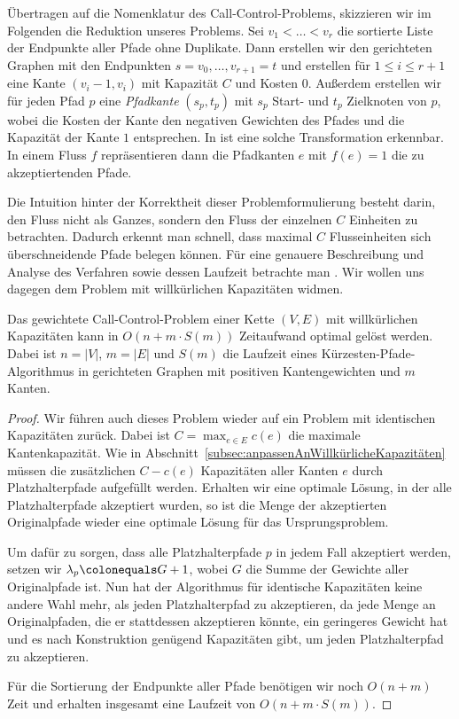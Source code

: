 Übertragen auf die Nomenklatur des Call-Control-Problems, skizzieren wir im Folgenden die Reduktion unseres Problems.
Sei $v_1 < \dots < v_r$ die sortierte Liste der Endpunkte aller Pfade ohne Duplikate.
Dann erstellen wir den gerichteten Graphen mit den Endpunkten $s = v_0, \dots, v_{r+1}=t$ und erstellen
für $1 \leq i \leq r+1$ eine Kante $(v_i-1, v_i)$ mit Kapazität $C$ und Kosten $0$.
Außerdem erstellen wir für jeden Pfad $p$ eine {\em Pfadkante} $(s_p, t_p)$ mit $s_p$ Start- und $t_p$ Zielknoten von $p$,
wobei die Kosten der Kante den negativen Gewichten des Pfades und die Kapazität der Kante $1$ entsprechen.
In  ist eine solche Transformation erkennbar.
In einem Fluss $f$ repräsentieren dann die Pfadkanten $e$ mit $f(e)=1$ die zu akzeptiertenden Pfade.

Die Intuition hinter der Korrektheit dieser Problemformulierung besteht darin, den Fluss nicht als Ganzes, sondern
den Fluss der einzelnen $C$ Einheiten zu betrachten.
Dadurch erkennt man schnell, dass maximal $C$ Flusseinheiten sich überschneidende Pfade belegen können.
Für eine genauere Beschreibung und Analyse des Verfahren sowie dessen Laufzeit betrachte man .
Wir wollen uns dagegen dem Problem mit willkürlichen Kapazitäten widmen.

\begin{theorem}
    Das gewichtete Call-Control-Problem einer Kette $(V, E)$ mit willkürlichen Kapazitäten kann in $O(n + m\cdot S(m))$
    Zeitaufwand optimal gelöst werden.
    Dabei ist $n = |V|$, $m=|E|$ und $S(m)$ die Laufzeit eines Kürzesten-Pfade-Algorithmus in gerichteten Graphen mit
    positiven Kantengewichten und $m$ Kanten.
\end{theorem}
\begin{proof}
    Wir führen auch dieses Problem wieder auf ein Problem mit identischen Kapazitäten zurück.
    Dabei ist $C = \max_{e \in E}c(e)$ die maximale Kantenkapazität.
    Wie in Abschnitt~\ref{subsec:anpassenAnWillkürlicheKapazitäten} müssen die zusätzlichen $C - c(e)$ Kapazitäten
    aller Kanten $e$ durch Platzhalterpfade aufgefüllt werden.
    Erhalten wir eine optimale Lösung, in der alle Platzhalterpfade akzeptiert wurden, so ist die Menge der akzeptierten
    Originalpfade wieder eine optimale Lösung für das Ursprungsproblem.

    Um dafür zu sorgen, dass alle Platzhalterpfade $p$ in jedem Fall akzeptiert werden, setzen wir
    $\lambda_p \colonequals G + 1$, wobei $G$ die Summe der Gewichte aller Originalpfade ist.
    Nun hat der Algorithmus für identische Kapazitäten keine andere Wahl mehr, als jeden Platzhalterpfad zu akzeptieren,
    da jede Menge an Originalpfaden, die er stattdessen akzeptieren könnte, ein geringeres Gewicht hat und es nach
    Konstruktion genügend Kapazitäten gibt, um jeden Platzhalterpfad zu akzeptieren.

    Für die Sortierung der Endpunkte aller Pfade benötigen wir noch $O(n+m)$ Zeit und erhalten insgesamt eine Laufzeit
    von $O(n+m\cdot S(m))$.
\end{proof}

